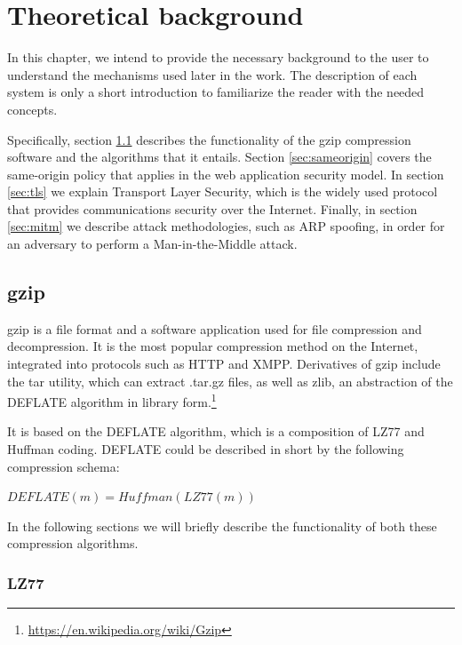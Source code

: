 \chapter{Theoretical background}\label{background}

In this chapter, we intend to provide the necessary background to the user
to understand the mechanisms used later in the work. The description of
each system is only a short introduction to familiarize the reader with
the needed concepts.

Specifically, section \ref{sec:gzip} describes the functionality of the gzip
compression software and the algorithms that it entails. Section
\ref{sec:sameorigin} covers the same-origin policy that applies in the web
application security model. In section \ref{sec:tls} we explain Transport
Layer Security, which is the widely used protocol that provides communications
security over the Internet. Finally, in section \ref{sec:mitm} we describe
attack methodologies, such as ARP spoofing, in order for an
adversary to perform a Man-in-the-Middle attack.

\section{gzip}\label{sec:gzip}

gzip is a file format and a software application used for file compression and
decompression. It is the most popular compression method on the Internet, integrated
into protocols such as HTTP and XMPP. Derivatives of gzip include the tar utility, which 
can extract .tar.gz files, as well as zlib, an abstraction of the DEFLATE algorithm in 
library form.\footnote{\url{https://en.wikipedia.org/wiki/Gzip}}

It is based on the DEFLATE algorithm, which is a composition of LZ77 and Huffman
coding. DEFLATE could be described in short by the following compression schema:

\begin{math}DEFLATE(m) = Huffman(LZ77(m))\end{math}

In the following sections we will briefly describe the functionality of both
these compression algorithms.

\subsection{LZ77}\label{subsec:lz77}

